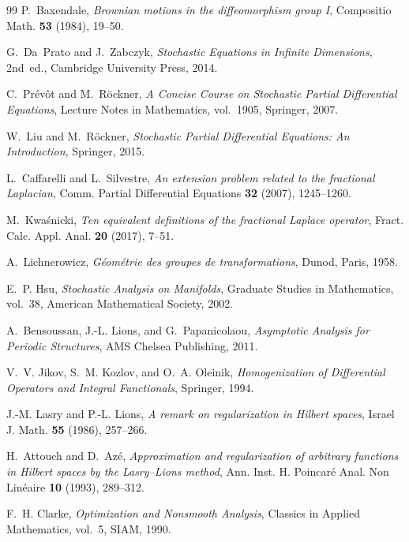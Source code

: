 \documentclass[11pt,a4paper,reqno]{article}
\theoremstyle{plain}
\theoremstyle{definition}
\theoremstyle{remark}
\numberwithin{equation}{section}
\begin{document}
\begin{thebibliography}{99}
P.~Baxendale,
\emph{Brownian motions in the diffeomorphism group I},
Compositio Math. \textbf{53} (1984), 19--50.

G.~Da~Prato and J.~Zabczyk,
\emph{Stochastic Equations in Infinite Dimensions}, 2nd~ed.,
Cambridge University Press, 2014.

C.~Pr\'ev\^ot and M.~R\"ockner,
\emph{A Concise Course on Stochastic Partial Differential Equations},
Lecture Notes in Mathematics, vol.~1905, Springer, 2007.

W.~Liu and M.~R\"ockner,
\emph{Stochastic Partial Differential Equations: An Introduction},
Springer, 2015.

L.~Caffarelli and L.~Silvestre,
\emph{An extension problem related to the fractional Laplacian},
Comm. Partial Differential Equations \textbf{32} (2007), 1245--1260.

M.~Kwa\'snicki,
\emph{Ten equivalent definitions of the fractional Laplace operator},
Fract. Calc. Appl. Anal. \textbf{20} (2017), 7--51.

A.~Lichnerowicz,
\emph{G\'eom\'etrie des groupes de transformations},
Dunod, Paris, 1958.

E.~P. Hsu,
\emph{Stochastic Analysis on Manifolds},
Graduate Studies in Mathematics, vol.~38, American Mathematical Society, 2002.

A.~Bensoussan, J.-L. Lions, and G.~Papanicolaou,
\emph{Asymptotic Analysis for Periodic Structures},
AMS Chelsea Publishing, 2011.

V.~V. Jikov, S.~M. Kozlov, and O.~A. Oleinik,
\emph{Homogenization of Differential Operators and Integral Functionals},
Springer, 1994.

J.-M. Lasry and P.-L. Lions,
\emph{A remark on regularization in Hilbert spaces},
Israel J. Math. \textbf{55} (1986), 257--266.

H.~Attouch and D.~Az\'e,
\emph{Approximation and regularization of arbitrary functions in Hilbert spaces by the Lasry--Lions method},
Ann. Inst. H. Poincar\'e Anal. Non Lin\'eaire \textbf{10} (1993), 289--312.

F.~H. Clarke,
\emph{Optimization and Nonsmooth Analysis},
Classics in Applied Mathematics, vol.~5, SIAM, 1990.


\end{thebibliography}
\end{document}
